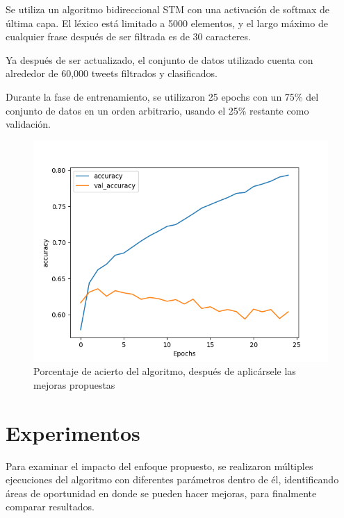 \documentclass[a4]{sciposter}
\begin{document}
\begin{multicols}{3}
Se utiliza un algoritmo bidireccional STM con una activación de softmax de última capa. El léxico está limitado a 5000 elementos, y el largo máximo de cualquier frase después de ser filtrada es de 30 caracteres.

Ya después de ser actualizado, el conjunto de datos utilizado cuenta con alrededor de 60,000 tweets filtrados y clasificados.

Durante la fase de entrenamiento, se utilizaron 25 epochs con un 75\% del conjunto de datos en un orden arbitrario, usando el 25\% restante como validación.

\begin{figure}
	\centering
	\captionsetup{type=figure}
	\setcounter{figure}{1}
	\includegraphics[scale=1.3]{img/Accuracy 2021-07.png}
	\caption{Porcentaje de acierto del algoritmo, después de aplicársele las mejoras propuestas}	
\end{figure}

\section{Experimentos}
Para examinar el impacto del enfoque propuesto, se realizaron múltiples ejecuciones del algoritmo con diferentes parámetros dentro de él, identificando áreas de oportunidad en donde se pueden hacer mejoras, para finalmente comparar resultados.



\begin{figure}[!tbp]
\captionsetup{type=figure}



\end{figure}
\end{multicols}
\end{document}
